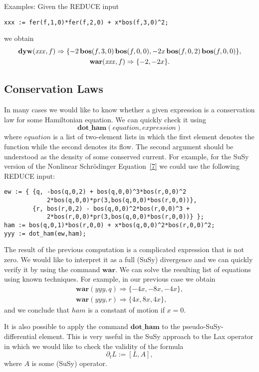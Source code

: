 {Examples: Given the REDUCE input
\begin{verbatim}
xxx := fer(f,1,0)*fer(f,2,0) + x*bos(f,3,0)^2;
\end{verbatim}
we obtain
\begin{gather*}
  \mathbf{dyw}(\mathit{xxx},f) \Rightarrow
  \{ -2\,\mathbf{bos}(f,3,0)\,\mathbf{bos}(f,0,0), -2x\,\mathbf{bos}(f,0,2)\,\mathbf{bos}(f,0,0) \}, \\
  \mathbf{war}(\mathit{xxx},f) \Rightarrow \{ -2, -2x \}.
\end{gather*}

\subsection{Conservation Laws}

In many cases we would like to know whether a given expression is a
conservation law for some Hamiltonian equation.  We can quickly check
it using
\begin{equation*}
  \mathbf{dot\_ham}(\mathit{equation},\mathit{expression})
\end{equation*}
where $\mathit{equation}$ is a list of two-element lists in which the
first element denotes the function while the second denotes its flow.
The second argument should be understood as the density of some
conserved current.  For example, for the SuSy version of the Nonlinear
Schr\"odinger Equation~\hyperlink{susy2-bib}{[7]} we could use the
following REDUCE input:
\newpage
\begin{verbatim}
ew := { {q, -bos(q,0,2) + bos(q,0,0)^3*bos(r,0,0)^2
            2*bos(q,0,0)*pr(3,bos(q,0,0)*bos(r,0,0))},
        {r, bos(r,0,2) - bos(q,0,0)^2*bos(r,0,0)^3 +
            2*bos(r,0,0)*pr(3,bos(q,0,0)*bos(r,0,0))} };
ham := bos(q,0,1)*bos(r,0,0) + x*bos(q,0,0)^2*bos(r,0,0)^2;
yyy := dot_ham(ew,ham);
\end{verbatim}
The result of the previous computation is a complicated expression
that is not zero.  We would like to interpret it as a full (SuSy)
divergence and we can quickly verify it by using the command
$\mathbf{war}$.  We can solve the resulting list of equations using
known techniques.  For example, in our previous case we obtain
\begin{gather*}
  \mathbf{war}(yyy,q) \Rightarrow \{-4x,-8x,-4x\}, \\
  \mathbf{war}(yyy,r) \Rightarrow \{4x,8x,4x\},
\end{gather*}
and we conclude that $\mathit{ham}$ is a constant of motion if $x=0$.

It is also possible to apply the command $\mathbf{dot\_ham}$ to the
pseudo-SuSy-differential element.  This is very useful in the SuSy
approach to the Lax operator in which we would like to check the
validity of the formula
\begin{equation*}
  \partial_{t}L := [ L,A ],
\end{equation*}
where $A$ is some (SuSy) operator.

}
